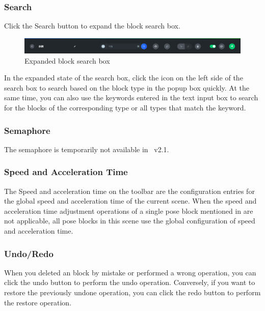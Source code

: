 \subsubsection{Search}
Click the Search button to expand the block search box.

\begin{figure}[ht]
	\centering
	\includegraphics[width=\textwidth]{en/image/3-15.png}
	\caption{Expanded block search box}
	\label{fig:展开的动作块搜索框}
\end{figure}

In the expanded state of the search box, click the icon  on the left side of the search box to search based on the block type in the pop­up box quickly. At the same time, you can also use the keywords entered in the text input box to search for the blocks of the corresponding type or all types that match the keyword.


\subsubsection{Semaphore}
The semaphore is temporarily not available in \LM~v2.1.


\subsubsection{Speed and Acceleration Time}
\label{sec:速度和加速时间}
The Speed and acceleration time on the toolbar are the configuration entries for the global speed and acceleration time of the current scene. When the speed and acceleration time adjustment operations of a single pose block mentioned in  are not applicable, all pose blocks in this scene use the global configuration of speed and acceleration time.


\subsubsection{Undo/Redo}
When you deleted an block by mistake or performed a wrong operation, you can click the undo button  to perform the undo operation. Conversely, if you want to restore the previously undone operation, you can click the redo button  to perform the restore operation.

